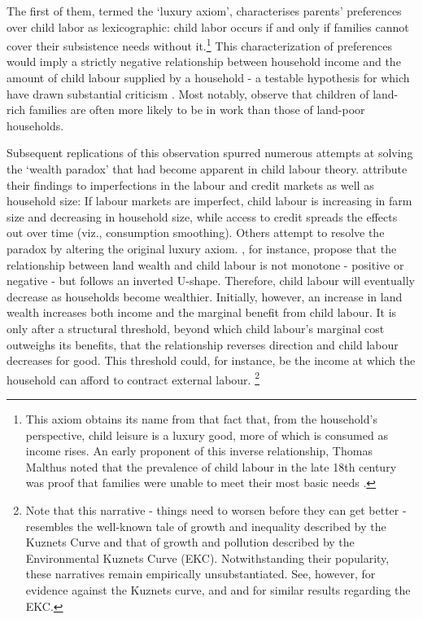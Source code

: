 \documentclass[a4paper,12pt]{article}
\theoremstyle{plain}
\theoremstyle{definition}
\theoremstyle{definition}
\theoremstyle{definition}
\theoremstyle{definition}
\begin{document}
The first of them, termed the `luxury axiom', characterises parents' preferences over child labor as lexicographic: child labor occurs if and only if families cannot cover their subsistence needs without it.\footnote{This axiom obtains its name from that fact that, from the household's perspective, child leisure is a luxury good, more of which is consumed as income rises. An early proponent of this inverse relationship, Thomas Malthus noted that the prevalence of child labour in the late 18th century was proof that families were unable to meet their most basic needs \citep[see][]{Edmonds2007}.} This characterization of preferences would imply a strictly negative relationship between household income and the amount of child labour supplied by a household - a testable hypothesis for which \citet{Basu1998} have drawn substantial criticism \citep[see e.g.][]{Edmonds2012}. Most notably, \citet{Bhalotra2000,Bhalotra2003} observe that children of land-rich families are often more likely to be in work than those of land-poor households.

Subsequent replications of this observation spurred numerous attempts at solving the `wealth paradox' that had become apparent in child labour theory. \citet{Bhalotra2003} attribute their findings to imperfections in the labour and credit markets as well as household size: If labour markets are imperfect, child labour is increasing in farm size and decreasing in household size, while access to credit spreads the effects out over time (viz., consumption smoothing). Others attempt to resolve the paradox by altering the original luxury axiom. \citet{Basu2010}, for instance, propose that the relationship between land wealth and child labour is not monotone - positive or negative - but follows an inverted U-shape. Therefore, child labour will eventually decrease as households become wealthier. Initially, however, an increase in land wealth increases both income and the marginal benefit from child labour. It is only after a structural threshold, beyond which child labour's marginal cost outweighs its benefits, that the relationship reverses direction and child labour decreases for good. This threshold could, for instance, be the income at which the household can afford to contract external labour. \footnote{Note that this narrative - things need to worsen before they can get better -  resembles the well-known tale of growth and inequality described by the Kuznets Curve \citep{Kuznets1955, Kuznets1963} and that of growth and pollution described by the Environmental Kuznets Curve (EKC). Notwithstanding their popularity, these narratives remain empirically unsubstantiated. See, however, \citet{Piketty2014} for evidence against the Kuznets curve, and \citet{Mills2009} and \citet{Ozokcu2017} for similar results regarding the EKC.} 
\end{document}
